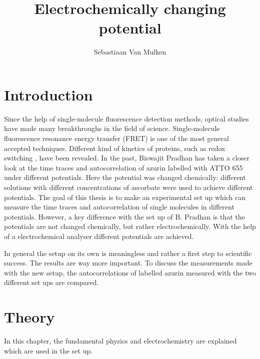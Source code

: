 \documentclass[twoside,single]{lion-msc}
\title{Electrochemically changing potential}
\author{Sebastiaan Van Mulken}
\begin{document}
\maketitle



\chapter{Introduction}
Since the help of single-molecule fluorescence detection methods, optical studies have made many breakthroughs in the field of science. Single-molecule fluorescence resonance energy transfer (FRET) is one of the most general accepted techniques. Different kind of kinetics of proteins, such as redox switching \cite{Akklc}, have been revealed. In the past, Biswajit Pradhan has taken a closer look at the time traces and autocorrelation of azurin labelled with ATTO 655 under different potentials. Here the potential was changed chemically: different solutions with different concentrations of ascorbate were used to achieve different potentials. The goal of this thesis is to make an experimental set up which can measure the time traces and autocorrelation of single molecules in different potentials. However, a key difference with the set up of B. Pradhan is that the potentials are not changed chemically, but rather electrochemically. With the help of a electrochemical analyser different potentials are achieved. 

In general the setup on its own is meaningless and rather a first step to scientific success. The results are way more important. To discuss the measurements made with the new setup, the autocorrelations of labelled azurin measured with the two different set ups are compared. 
\chapter{Theory}
In this chapter, the fundamental physics and electrochemistry are explained which are used in the set up.
\end{document}
